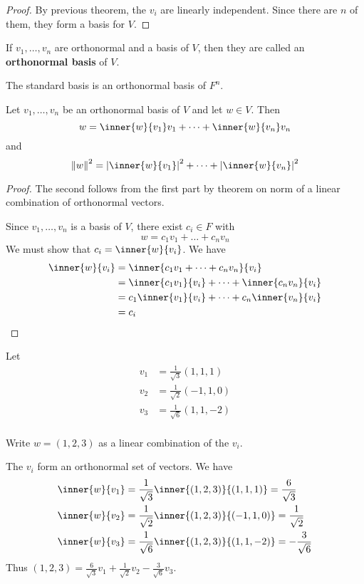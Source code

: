 \documentclass{article}
\begin{document}
    \begin{proof}
      By previous theorem, the $v_i$ are linearly independent. Since there are $n$ of them, they form a basis for $V$.
    \end{proof}
    \begin{definition}
      If $v_1, \ldots, v_n$ are orthonormal and a basis of $V$, then they are called an \textbf{orthonormal basis} of $V$.
    \end{definition}
    \begin{definition}
      The standard basis is an orthonormal basis of $F^n$.
    \end{definition}
    \begin{theorem}
      Let $v_1, \ldots, v_n$ be an orthonormal basis of $V$ and let $w \in V$. Then \[
        w = \inner{w}{v_1}v_1 + \dots + \inner{w}{v_n}v_n
      \] and \[
        \norm{w}^2 = \abs{\inner{w}{v_1}}^2 + \dots + \abs{\inner{w}{v_n}}^2
      \]
    \end{theorem}
    \begin{proof}
      The second follows from the first part by theorem on norm of a linear combination of orthonormal vectors.

      Since $v_1, \ldots, v_n$ is a basis of $V$, there exist $c_i \in F$ with
      \[
        w = c_1v_1 + \dots + c_nv_n
      \]
      We must show that $c_i = \inner{w}{v_i}$. We have
      \begin{align*}
        \inner{w}{v_i} &= \inner{c_1v_1 + \dots + c_nv_n}{v_i}\\
        &= \inner{c_1v_1}{v_i} + \dots + \inner{c_nv_n}{v_i}\\
        &= c_1\inner{v_1}{v_i} + \dots + c_n\inner{v_n}{v_i}\\
        &= c_i
      \end{align*}
    \end{proof}
    \begin{example}
      Let
      \begin{align*}
        v_1 &= \frac{1}{\sqrt{3}}(1, 1, 1)\\
        v_2 &= \frac{1}{\sqrt{2}}(-1, 1, 0)\\
        v_3 &= \frac{1}{\sqrt{6}}(1, 1, -2)\\
      \end{align*}

      Write $w = (1, 2, 3)$ as a linear combination of the $v_i$.

      The $v_i$ form an orthonormal set of vectors. We have
      \begin{align*}
        \inner{w}{v_1} &= \frac{1}{\sqrt{3}}\inner{(1, 2, 3)}{(1, 1, 1)} = \frac{6}{\sqrt{3}}\\
        \inner{w}{v_2} &= \frac{1}{\sqrt{2}}\inner{(1, 2, 3)}{(-1, 1, 0)} = \frac{1}{\sqrt{2}}\\
        \inner{w}{v_3} &= \frac{1}{\sqrt{6}}\inner{(1, 2, 3)}{(1, 1, -2)} = -\frac{3}{\sqrt{6}}\\
      \end{align*}
      Thus $(1, 2, 3) = \frac{6}{\sqrt{3}}v_1 + \frac{1}{\sqrt{2}}v_2 - \frac{3}{\sqrt{6}}v_3$.
    \end{example}
\end{document}
